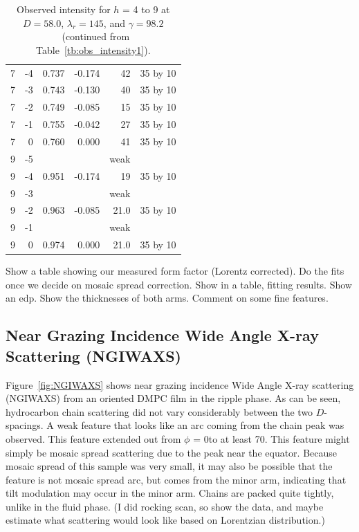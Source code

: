 \begin{table}[htbp]
\begin{tabular}{rrrrrr}
    7 & -4 & 0.737 & -0.174 &	    42 & 35 by 10 \\
    7	& -3 & 0.743 & -0.130	&     40 & 35 by 10 \\
    7	& -2 & 0.749 & -0.085	&     15 & 35 by 10 \\
    7	& -1 & 0.755 & -0.042	&     27 & 35 by 10 \\
    7 &  0 & 0.760 &  0.000	&     41 & 35 by 10 \\
    9 & -5 &       &        &	  weak & \\
    9 &	-4 & 0.951 & -0.174	&	    19 & 35 by 10 \\
    9 & -3 &       &        &	  weak & \\
    9 & -2 & 0.963 & -0.085 &   21.0 & 35 by 10 \\
	  9	& -1 &       &        &   weak & \\
	  9 &  0 & 0.974 &  0.000	&   21.0 & 35 by 10 \\
    \hline
  \end{tabular}
  \caption{Observed intensity for $h$ = 4 to 9 at $D=58.0$, $\lambda_r=145$, and 
  $\gamma=98.2$\textdegree\ (continued from Table~\ref{tb:obs_intensity1}).}
  \label{tb:obs_intensity2}
\end{table}


Show a table showing our measured form factor (Lorentz corrected). Do the 
fits once we decide on mosaic spread correction. Show in a table, fitting 
results. Show an edp. Show the thicknesses of both arms. Comment on
some fine features.

\subsection{Near Grazing Incidence Wide Angle X-ray Scattering (NGIWAXS)}
\label{sec:NGIWAXS_results}
Figure~\ref{fig:NGIWAXS} shows near grazing incidence Wide Angle X-ray
scattering (NGIWAXS) from an oriented DMPC film in the ripple phase.
As can be seen, hydrocarbon chain scattering did not vary considerably
between the two $D$-spacings. A weak feature that looks like an 
arc coming from the chain peak was observed. This feature extended
out from $\phi$ = 0\textdegree to at least 70\textdegree. This feature
might simply be mosaic spread scattering due to the peak near the equator.
Because mosaic spread of this sample was very small, 
it may also be possible that the feature is not mosaic spread arc,
but comes from the minor arm, indicating
that tilt modulation may occur in the minor arm. Chains are
packed quite tightly, unlike in the fluid phase. (I did rocking scan,
so show the data, and maybe estimate what scattering would look like 
based on Lorentzian distribution.)

